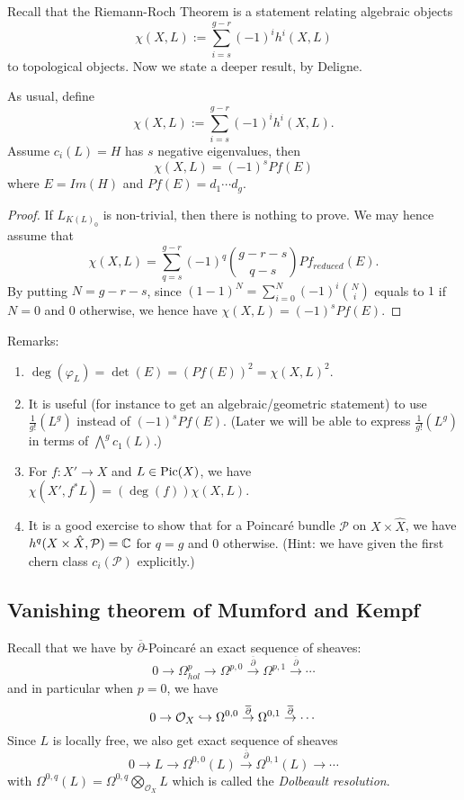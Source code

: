 Recall that the Riemann-Roch Theorem is a statement relating algebraic objects 
$$\chi(X,L):=\sum_{i=s}^{g-r}(-1)^i h^i(X,L)$$
to topological objects.
Now we state a deeper result, by Deligne.

\begin{corollary}
As usual, define
$$\chi(X,L):=\sum_{i=s}^{g-r}(-1)^i h^i(X,L).$$
Assume $c_i(L)=H$ has $s$ negative eigenvalues, then 
$$\chi(X,L)=(-1)^s Pf(E)$$
where $E=Im(H)$ and $Pf(E)=d_1\cdots d_g$.

\end{corollary}

\begin{proof}
If $L_{K(L)_0}$ is non-trivial, then there is nothing to prove.
We may hence assume that 
$$\chi(X,L)=\sum_{q=s}^{g-r} (-1)^q \binom{g-r-s}{q-s} Pf_{reduced}(E).$$
By putting $N=g-r-s$, since $(1-1)^N=\sum_{i=0}^N (-1)^i\binom{N}{i}$ equals to $1$ if $N=0$ and $0$ otherwise, we hence have $\chi(X,L)=(-1)^s Pf(E)$. 

\end{proof}

Remarks: 
\begin{enumerate}
\item $\deg(\varphi_L)=\det(E)=(Pf(E))^2=\chi(X,L)^2$.
\item It is useful (for instance to get an algebraic/geometric statement) to use $\frac{1}{g!}(L^g)$ instead of $(-1)^s Pf(E)$. (Later we will be able to express $\frac{1}{g!}(L^g)$ in terms of $\bigwedge^g c_1(L)$.)
\item For $f:X'\to X$ and $L\in \operatorname{Pic}(X)$, we have $\chi(X',f^* L)=(\deg (f))\chi(X,L)$.
\item It is a good exercise to show that for a Poincar\'{e} bundle $\mathcal{P}$ on $X\times \hat{X}$, we have $h^q(X\times\hat{X},\mathcal{P})={\mathbb C}$ for $q=g$ and $0$ otherwise. (Hint: we have given the first chern class $c_i(\mathcal{P})$ explicitly.)
\end{enumerate}

\subsection{Vanishing theorem of Mumford and Kempf}

Recall that we have by $\overline{\partial}$-Poincar\'{e} an exact sequence of sheaves:
$$0\to \Omega_{hol}^p\to \Omega^{p,0}\overset{\overline{\partial}}{\to} \Omega^{p,1}\overset{\overline{\partial}}{\to}\cdots$$
and in particular when $p=0$, we have
$$0\to \mathcal{O}_X\hookrightarrow \Omega^{0,0}\overset{\overline{\partial}}{\to} \Omega^{0,1}\overset{\overline{\partial}}{\to}\cdots$$
Since $L$ is locally free, we also get exact sequence of sheaves 
$$0\to L \to \Omega^{0,0}(L)\overset{\overline{\partial}}{\to} \Omega^{0,1}(L)\to \cdots$$
with $\Omega^{0,q}(L)=\Omega^{0,q}\bigotimes_{\mathcal{O}_X}L$ which is called the \emph{Dolbeault resolution}. 


